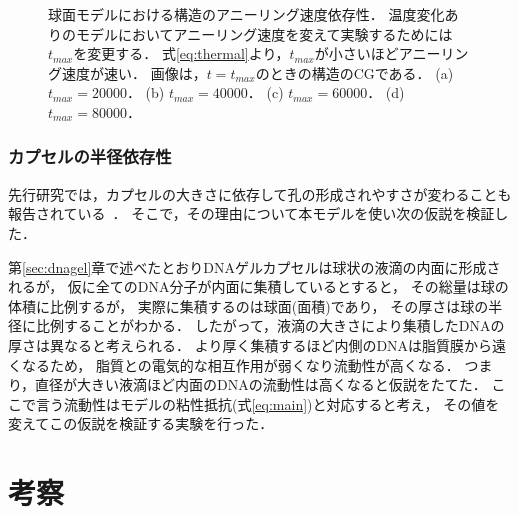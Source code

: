 \begin{figure}
\centering

\caption{
    球面モデルにおける構造のアニーリング速度依存性．
    温度変化ありのモデルにおいてアニーリング速度を変えて実験するためには$t_{max}$を変更する．
    式\ref{eq:thermal}より，$t_{max}$が小さいほどアニーリング速度が速い．
    画像は，$t=t_{max}$のときの構造のCGである．
    (a) $t_{max}=20000$．
    (b) $t_{max}=40000$．
    (c) $t_{max}=60000$．
    (d) $t_{max}=80000$．
}
\label{fig:result_sphere_anearing_speed}
\end{figure}


\subsubsection{カプセルの半径依存性}
先行研究では，カプセルの大きさに依存して孔の形成されやすさが変わることも報告されている~\cite{morita2017formation}．
そこで，その理由について本モデルを使い次の仮説を検証した．

第\ref{sec:dnagel}章で述べたとおりDNAゲルカプセルは球状の液滴の内面に形成されるが，
仮に全てのDNA分子が内面に集積しているとすると，
その総量は球の体積に比例するが，
実際に集積するのは球面(面積)であり，
その厚さは球の半径に比例することがわかる．
したがって，液滴の大きさにより集積したDNAの厚さは異なると考えられる．
より厚く集積するほど内側のDNAは脂質膜から遠くなるため，
脂質との電気的な相互作用が弱くなり流動性が高くなる．
つまり，直径が大きい液滴ほど内面のDNAの流動性は高くなると仮説をたてた．
ここで言う流動性はモデルの粘性抵抗(式\ref{eq:main})と対応すると考え，
その値を変えてこの仮説を検証する実験を行った．

\section{考察}
